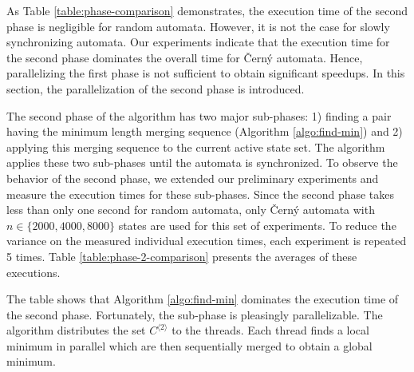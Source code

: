 \documentclass[12pt]{article}
\begin{document}
As Table \ref{table:phase-comparison} demonstrates, the execution time of the second phase is negligible for random automata. However, it is not the case for slowly synchronizing automata. Our experiments indicate that the execution time for the second phase dominates the overall time for \v{C}ern\'y automata. Hence, parallelizing the first phase is not sufficient to obtain significant speedups. In this section, the parallelization of the second phase is introduced.

The second phase of the algorithm has two major sub-phases: 1) finding a pair having the minimum length merging sequence (Algorithm \ref{algo:find-min}) and 2) applying this merging sequence to the current active state set. The algorithm applies these two sub-phases until the automata is synchronized. To observe the behavior of the second phase, we extended our preliminary experiments and measure the execution times for these sub-phases. Since the second phase takes less than only one second for random automata, only \v{C}ern\'y automata with $n \in \{2000, 4000, 8000\}$ states are used for this set of experiments. To reduce the variance on the measured individual execution times, each experiment is repeated 5 times. Table \ref{table:phase-2-comparison} presents the averages of these executions.


\begin{table}[ht]
	\center
	\caption{Comparison of the execution time of Algorithm \ref{algo:find-min}~($t_{FIND\_MIN}$), i.e., the first sub-phase, and the second phase ($t_{SECOND\_PHASE}$).}
	\label{table:phase-2-comparison}
\end{table}

The table shows that Algorithm \ref{algo:find-min} dominates the execution time of the second phase. Fortunately, the sub-phase is pleasingly parallelizable. The algorithm distributes the set $C^{\langle 2 \rangle}$ to the threads. Each thread finds a local minimum in parallel which are then sequentially merged to obtain a global minimum.
\end{document}
